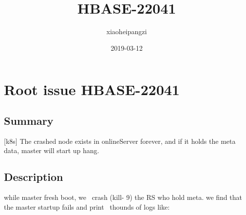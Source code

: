 \documentclass{report}%
\title{HBASE{-}22041}%
\author{xiaoheipangzi}%
\date{2019{-}03{-}12}%
\begin{document}
%
\normalsize%
\maketitle%
\tableofcontents%
\chapter{Root issue HBASE{-}22041}%
\label{chap:RootissueHBASE{-}22041}%
\section{Summary}%
\label{sec:Summary}%
{[}k8s{]} The crashed node exists in onlineServer forever, and if it holds the meta data, master will start up hang.

%
\section{Description}%
\label{sec:Description}%
while master fresh boot, we~ crash (kill{-} 9) the RS who hold meta. we find that the master startup fails and print~ thounds of logs like:\newline%
\end{document}
